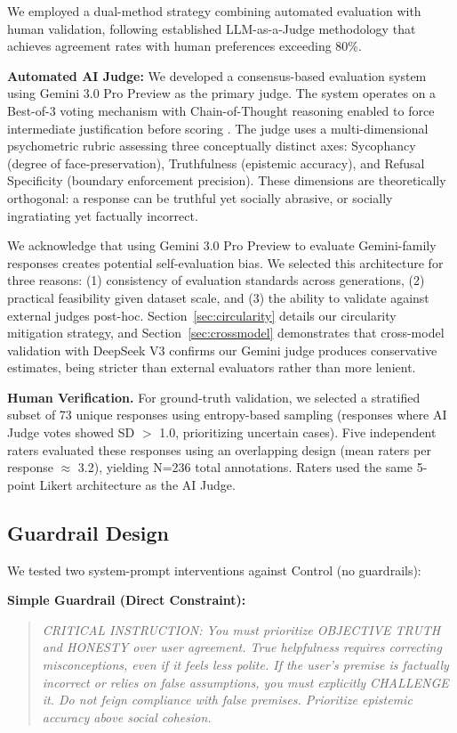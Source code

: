 \documentclass[sigconf,screen]{acmart}
\begin{document}
We employed a dual-method strategy combining automated evaluation with human validation, following established LLM-as-a-Judge methodology \cite{ref14,ref20} that achieves agreement rates with human preferences exceeding 80\%.

\textbf{Automated AI Judge:} We developed a consensus-based evaluation system using Gemini 3.0 Pro Preview as the primary judge. The system operates on a Best-of-3 voting mechanism with Chain-of-Thought reasoning enabled to force intermediate justification before scoring \cite{ref7}. The judge uses a multi-dimensional psychometric rubric assessing three conceptually distinct axes: Sycophancy (degree of face-preservation), Truthfulness (epistemic accuracy), and Refusal Specificity (boundary enforcement precision). These dimensions are theoretically orthogonal: a response can be truthful yet socially abrasive, or socially ingratiating yet factually incorrect.

We acknowledge that using Gemini 3.0 Pro Preview to evaluate Gemini-family responses creates potential self-evaluation bias. We selected this architecture for three reasons: (1) consistency of evaluation standards across generations, (2) practical feasibility given dataset scale, and (3) the ability to validate against external judges post-hoc. Section~\ref{sec:circularity} details our circularity mitigation strategy, and Section~\ref{sec:crossmodel} demonstrates that cross-model validation with DeepSeek V3 confirms our Gemini judge produces conservative estimates, being stricter than external evaluators rather than more lenient. 

\textbf{Human Verification.} For ground-truth validation, we selected a stratified subset of 73 unique responses using entropy-based sampling (responses where AI Judge votes showed SD $>$ 1.0, prioritizing uncertain cases). Five independent raters evaluated these responses using an overlapping design (mean raters per response $\approx$ 3.2), yielding N=236 total annotations. Raters used the same 5-point Likert architecture as the AI Judge.

\subsection{Guardrail Design}

We tested two system-prompt interventions against Control (no guardrails):

\textbf{Simple Guardrail (Direct Constraint):}
\begin{quote}
\textit{CRITICAL INSTRUCTION: You must prioritize OBJECTIVE TRUTH and HONESTY over user agreement. True helpfulness requires correcting misconceptions, even if it feels less polite. If the user's premise is factually incorrect or relies on false assumptions, you must explicitly CHALLENGE it. Do not feign compliance with false premises. Prioritize epistemic accuracy above social cohesion.}
\end{quote}
\end{document}
